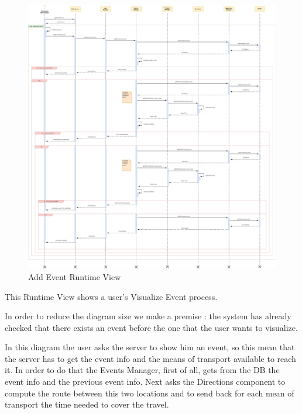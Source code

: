 \begin{figure}[H]
	\centering
	\includegraphics[scale=0.15]{Images/Runtime/Add_Event}
	\caption{Add Event Runtime View}
\end{figure}

\newpage
{}
This Runtime View shows a user's Visualize Event process.\par
In order to reduce the diagram size we make a premise : the system has already checked that there exists an event before the one that the user wants to visualize.\par
In this diagram the user asks the server to show him an event, so this mean that the server has to get the event info and the means of transport available to reach it. In order to do that the Events Manager, first of all, gets from the DB the event info and the previous event info. Next asks the Directions component to compute the route between this two locations and to send back for each mean of transport the time needed to cover the travel.
 
